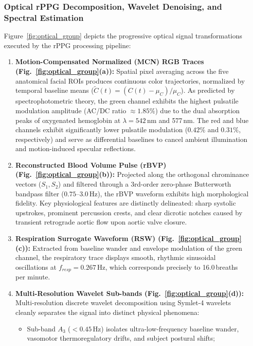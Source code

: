 \documentclass[journal]{IEEEtran}
\begin{document}
\subsubsection{Optical rPPG Decomposition, Wavelet Denoising, and Spectral Estimation}
Figure~\ref{fig:optical_group} depicts the progressive optical signal transformations executed by the rPPG processing pipeline:
\begin{enumerate}
    \item \textbf{Motion-Compensated Normalized (MCN) RGB Traces (Fig.~\ref{fig:optical_group}(a)):} Spatial pixel averaging across the five anatomical facial ROIs produces continuous color trajectories, normalized by temporal baseline means ($\tilde{C}(t) = (C(t) - \mu_C)/\mu_C$). As predicted by spectrophotometric theory, the green channel exhibits the highest pulsatile modulation amplitude (AC/DC ratio $\approx 1.85\%$) due to the dual absorption peaks of oxygenated hemoglobin at $\lambda = 542$\,nm and 577\,nm. The red and blue channels exhibit significantly lower pulsatile modulation ($0.42\%$ and $0.31\%$, respectively) and serve as differential baselines to cancel ambient illumination and motion-induced specular reflections.
    \item \textbf{Reconstructed Blood Volume Pulse (rBVP) (Fig.~\ref{fig:optical_group}(b)):} Projected along the orthogonal chrominance vectors ($S_1, S_2$) and filtered through a 3rd-order zero-phase Butterworth bandpass filter ($0.75$--$3.0$\,Hz), the rBVP waveform exhibits high morphological fidelity. Key physiological features are distinctly delineated: sharp systolic upstrokes, prominent percussion crests, and clear dicrotic notches caused by transient retrograde aortic flow upon aortic valve closure.
    \item \textbf{Respiration Surrogate Waveform (RSW) (Fig.~\ref{fig:optical_group}(c)):} Extracted from baseline wander and envelope modulation of the green channel, the respiratory trace displays smooth, rhythmic sinusoidal oscillations at $f_{resp} = 0.267$\,Hz, which corresponds precisely to 16.0\,breaths per minute.
    \item \textbf{Multi-Resolution Wavelet Sub-bands (Fig.~\ref{fig:optical_group}(d)):} Multi-resolution discrete wavelet decomposition using Symlet-4 wavelets cleanly separates the signal into distinct physical phenomena:
    \begin{itemize}
        \item Sub-band $A_3$ ($<0.45$\,Hz) isolates ultra-low-frequency baseline wander, vasomotor thermoregulatory drifts, and subject postural shifts;

\end{itemize}
\end{enumerate}
\end{document}
